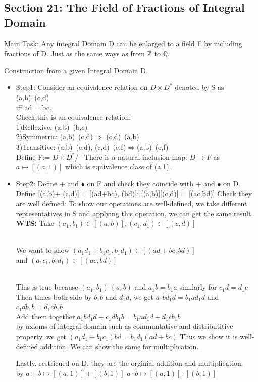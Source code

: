 \documentclass{article}
\newcommand\Z{\ensuremath{\mathbb{Z}}}
\newcommand\Q{\ensuremath{\mathbb{Q}}}
\begin{document}
\newpage
\subsection{Section 21: The Field of Fractions of Integral Domain}

\begin{note}
    Main Task: Any integral Domain D can be enlarged to a field F by including fractions of D. Just as the same ways as from $\Z$ to $\Q$.
\end{note}

 Construction from a given Integral Domain D.
\begin{itemize}
    \item Step1:  Consider an equivalence relation on $D\times D^*$ denoted by S as (a,b)~(c,d)
    \\ iff ad = bc.
    \\Check this is an equivalence relation:
    \\ 1)Reflexive: (a,b)~(b,c)
    \\ 2)Symmetric: (a,b)~(c,d)$\Rightarrow$ (c,d)~(a,b)
    \\ 3)Transitive: (a,b)~(c,d), (c,d)~(e,f)$\Rightarrow$(a,b)~(e,f)
\\Define F:=  $D\times D^*$/~
There is a natural inclusion map: $D\rightarrow F$ as $a\mapsto [(a,1)]$ which is equivalence class of (a,1).
\item Step2: Define + and $\bullet$ on F and check they coincide with + and $\bullet$ on D. 
\\Define [(a,b)+ (c,d)] = [(ad+bc), (bd)]; [(a,b)][(c,d)] = [(ac,bd)]
Check they are well defined: To show our operations are well-defined, we take different representatives in S and applying this operation, we can get the same result. 
\\\textbf{WTS:} Take $(a_1,b_1) \in [(a,b)], (c_1,d_1) \in [(c,d)]$  

\\We want to show $(a_1d_1 + b_1c_1, b_1d_1) \in [(ad+bc, bd)]$ 
\\ and $(a_1c_1, b_1d_1) \in [(ac, bd)]$ 

\\This is true because $(a_1,b_1) ~ (a,b)$ and $a_1b = b_1a$ similarly for $c_1d = d_1c$ 
\\Then times both side by $b_1b$ and $d_1d$, we get $a_1bd_1d = b_1ad_1d$ and $c_1db_1b = d_1cb_1b$ 
\\Add them together,$a_1bd_1d + c_1db_1b = b_1ad_1d + d_1cb_1b$ 
\\by axioms of integral domain such as communtative and distributitive property, we get $(a_1d_1+b_1c_1)bd = b_1d_1(ad+bc)$
Thus we show it is well-defined addition. We can show the same for multiplication. 

Lastly, restricued on D, they are the orginial addition and multiplication.
\\ by $ a+b\mapsto [(a,1)] + [(b,1)]$  $a\cdot b\mapsto [(a,1)] \cdot [(b,1)]$
\end{itemize}
\end{document}
